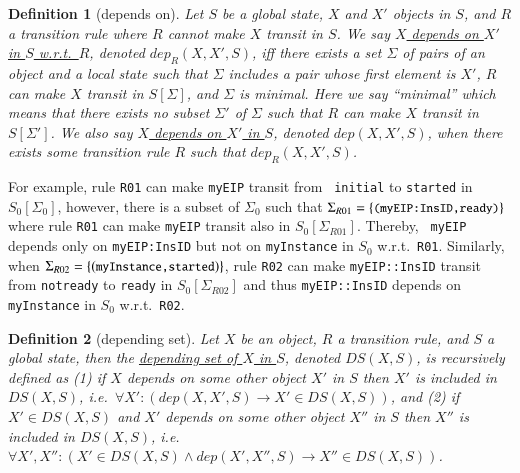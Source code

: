 \documentclass[12pt]{report}
\newtheorem{definition}{Definition}
\newcommand{\ra}{\rightarrow}
\newcommand{\mbstt}[1]{\mbox{\small{\tt {#1}}}}
\newcommand{\ul}{\underline}
\begin{document}
\begin{definition}[depends on]
Let $S$ be a global state, $X$ and $X'$ objects in $S$, and $R$
a transition rule where $R$ cannot make $X$ transit in $S$.  We say
\ul{$X$ depends on $X'$ in $S$ w.r.t.\ $R$}, denoted \ul{$\mathit{dep}_R(X,
  X',S)$}, iff there exists a set $\Sigma$ of pairs of an object and a
local state such that $\Sigma$ includes a pair whose first element is
$X'$, $R$ can make $X$ transit in $S[\Sigma]$, and $\Sigma$ is
minimal.  Here we say ``minimal'' which means that there exists no
subset $\Sigma'$ of $\Sigma$ such that $R$ can make $X$ transit in
$S[\Sigma']$. We also say \ul{$X$ depends on $X'$ in $S$}, denoted
\ul{$\mathit{dep}(X, X',S)$}, when there exists some transition rule $R$ such
that $\mathit{dep}_R(X,X',S)$.
\end{definition}
For example, rule {\tt R01} can make {\tt myEIP} transit from {\tt
  initial} to {\tt started} in $\mathit{S_0}[\Sigma_0]$, however, there is a
subset of $\Sigma_0$ such that
$\Sigma_{R01}=\{\mbstt{(myEIP:InsID,ready)}\}$ where rule {\tt R01}
can make {\tt myEIP} transit also in $\mathit{S_0}[\Sigma_{R01}]$. Thereby, {\tt
  myEIP} depends only on {\tt myEIP:InsID} but not on {\tt myInstance}
in $\mathit{S_0}$ w.r.t.\ {\tt R01}. Similarly, when
$\Sigma_{R02}=\{(\mbstt{myInstance,started})\}$, rule {\tt R02} can
make {\tt myEIP::InsID} transit from {\tt notready} to {\tt ready} in
$\mathit{S_0}[\Sigma_{R02}]$ and thus {\tt myEIP::InsID} depends on {\tt
  myInstance} in $\mathit{S_0}$ w.r.t.\ {\tt R02}.

\begin{definition}[depending set]
Let $X$ be an object, $R$ a transition rule, and $S$ a global
state, then the \ul{depending set of $X$ in $S$}, denoted
\ul{$DS(X,S)$}, is recursively defined as (1) if $X$ depends on some
other object $X'$ in $S$ then $X'$ is included in
$DS(X,S)$, i.e.\ $\forall X': (\mathit{dep}(X,X',S) \ra X'\in DS(X,S))$, and
(2) if $X' \in DS(X,S)$ and $X'$ depends on some other object $X''$
in $S$ then $X''$ is included in $DS(X,S)$, i.e.\ $\forall
X',X'': (X'\in DS(X,S) \land \mathit{dep}(X',X'',S) \ra X''\in DS(X,S))$.
\end{definition}
\end{document}
